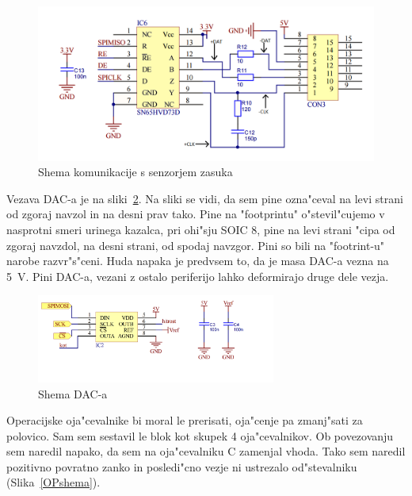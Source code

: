 \documentclass[a4paper]{article}
\begin{document}
	\begin{figure}[h!]
		\centering
		\includegraphics[width=\textwidth]{SPI_interface.png}
		\caption{Shema komunikacije s senzorjem zasuka}
		\label{SPIshema}
	\end{figure}
Vezava DAC-a je na sliki~\ref{DACshema}. Na sliki se vidi, da sem pine ozna"ceval na levi strani od zgoraj navzol in na desni prav tako. Pine na "footprintu" o"stevil"cujemo v nasprotni smeri urinega kazalca, pri ohi"sju SOIC 8, pine na levi strani "cipa od zgoraj navzdol, na desni strani, od spodaj navzgor.
Pini so bili na "footrint-u" narobe razvr"s"ceni. Huda napaka je predvsem to, da je masa DAC-a vezna na 5~V. Pini DAC-a, vezani z ostalo periferijo lahko deformirajo druge dele vezja.



	\begin{figure}[!h]
		\centering
		\includegraphics[width=0.7\textwidth]{DAC.png}
		\caption{Shema DAC-a}
		\label{DACshema}
	\end{figure}



Operacijske oja"cevalnike bi moral le prerisati, oja"cenje pa zmanj"sati za polovico. Sam sem sestavil le blok kot skupek 4 oja"cevalnikov. Ob povezovanju sem naredil napako, da sem na  oja"cevalniku C zamenjal vhoda. Tako sem naredil pozitivno povratno zanko in posledi"cno vezje ni ustrezalo od"stevalniku (Slika~\ref{OPshema}).
\end{document}
